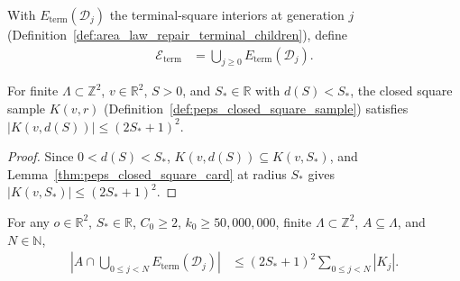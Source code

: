 \begin{definition}
    \label{def:area_law_repair_terminal_interiors}
    \leanok
    With $E_{\mathrm{term}}(\mathcal D_j)$ the terminal-square interiors at generation $j$
    (Definition~\ref{def:area_law_repair_terminal_children}), define
    \begin{align}
        \mathcal E_{\mathrm{term}}
         & =\bigcup_{j\ge0}E_{\mathrm{term}}(\mathcal D_j).
        \label{eq:area_law_repair_terminal_interiors}
    \end{align}
\end{definition}

\begin{lemma}
    \label{thm:area_law_repair_terminal_square_sites}
    \leanok
    For finite $\Lambda\subset\mathbb Z^2$, $v\in\mathbb R^2$, $S>0$, and $S_*\in\mathbb R$ with
    $d(S)<S_*$, the closed square sample $K(v,r)$ (Definition~\ref{def:peps_closed_square_sample})
    satisfies $|K(v,d(S))|\le(2S_*+1)^2$.
\end{lemma}

\begin{proof}
    \leanok
    Since $0<d(S)<S_*$, $K(v,d(S))\subseteq K(v,S_*)$, and Lemma~\ref{thm:peps_closed_square_card}
    at radius $S_*$ gives $|K(v,S_*)|\le(2S_*+1)^2$.
\end{proof}

\begin{lemma}
    \label{thm:area_law_repair_terminal_prefix_sites}
    \leanok
    For any $o\in\mathbb R^2$, $S_*\in\mathbb R$, $C_0\ge2$, $k_0\ge50{,}000{,}000$, finite
    $\Lambda\subset\mathbb Z^2$, $A\subseteq\Lambda$, and $N\in\mathbb N$,
    \begin{align}
        \left|A\cap\bigcup_{0\le j<N}E_{\mathrm{term}}(\mathcal D_j)\right|
         & \le (2S_*+1)^2\sum_{0\le j<N}|K_j|.
        \label{eq:area_law_repair_terminal_prefix_sites}
    \end{align}
\end{lemma}


